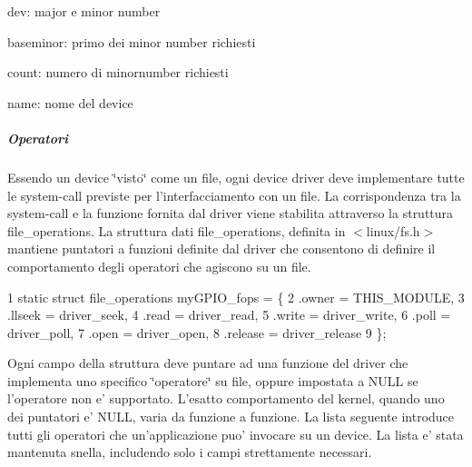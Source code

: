 \begin{DoxyItemize}
\item dev\+: major e minor number
\item baseminor\+: primo dei minor number richiesti
\item count\+: numero di minornumber richiesti
\item name\+: nome del device
\end{DoxyItemize}

\subparagraph*{Operatori}

Essendo un device \char`\"{}visto\char`\"{} come un file, ogni device driver deve implementare tutte le system-\/call previste per l'interfacciamento con un file. La corrispondenza tra la system-\/call e la funzione fornita dal driver viene stabilita attraverso la struttura file\+\_\+operations. La struttura dati file\+\_\+operations, definita in $<$linux/fs.\+h$>$ mantiene puntatori a funzioni definite dal driver che consentono di definire il comportamento degli operatori che agiscono su un file. 
\begin{DoxyCode}
1 static struct file\_operations myGPIO\_fops = \{
2     .owner      = THIS\_MODULE,
3     .llseek     = driver\_seek,
4     .read       = driver\_read,
5     .write      = driver\_write,
6     .poll       = driver\_poll,
7     .open       = driver\_open,
8     .release    = driver\_release
9 \};
\end{DoxyCode}
 Ogni campo della struttura deve puntare ad una funzione del driver che implementa uno specifico \char`\"{}operatore\char`\"{} su file, oppure impostata a N\+U\+L\+L se l'operatore non e' supportato. L'esatto comportamento del kernel, quando uno dei puntatori e' N\+U\+L\+L, varia da funzione a funzione. La lista seguente introduce tutti gli operatori che un'applicazione puo' invocare su un device. La lista e' stata mantenuta snella, includendo solo i campi strettamente necessari.


